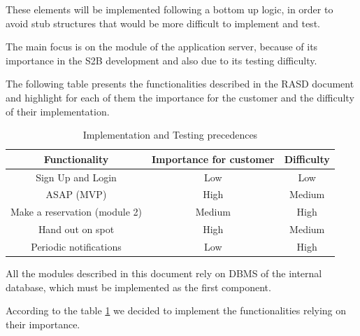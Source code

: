\documentclass[table, 12pt]{article}
\begin{document}
These elements will be implemented following a bottom up logic, in order to avoid stub structures that would be more difficult to implement and test.

The main focus is on the module of the application server, because of its importance in the S2B development and also due to its testing difficulty.

The following table presents the functionalities described in the RASD document and highlight for each of them the importance for the customer and the difficulty of their implementation.

\begin{center}
    \begin{table}[H]
        \begin{tabular}{ | c | c | c |}
            \hline
            \textbf{Functionality}        & \textbf{Importance for customer} & \textbf{Difficulty} \\ \hline
            Sign Up and Login             & Low                              & Low                 \\ \hline
            ASAP (MVP)                    & High                             & Medium              \\\hline
            Make a reservation (module 2) & Medium                           & High                \\\hline
            Hand out on spot              & High                             & Medium              \\\hline
            Periodic notifications        & Low                              & High                \\
            \hline
        \end{tabular}
        \caption{Implementation and Testing precedences}
        \label{implementation_precedences}
    \end{table}
\end{center}

All the modules described in this document rely on DBMS of the internal database, which must be implemented as the first component.

According to the table \ref{implementation_precedences} we decided to implement the functionalities relying on their importance.
\end{document}
